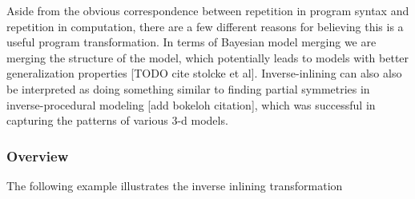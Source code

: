 \documentclass[a4paper,10pt]{article}
\begin{document}
Aside from the obvious correspondence between repetition in program syntax and repetition in computation, there are a few different reasons for believing this is a useful program transformation.  In terms of Bayesian model merging we are merging the structure of the model, which potentially leads to models with better generalization properties [TODO cite stolcke et al].  Inverse-inlining can also also be interpreted as doing something similar to finding partial symmetries in inverse-procedural modeling [add bokeloh citation], which was successful in capturing the patterns of various 3-d models.

\subsubsection{Overview}
The following example illustrates the inverse inlining transformation
\end{document}
